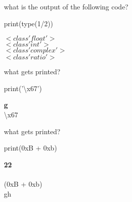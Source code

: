 \documentclass{exam}
\begin{document}
\begin{questions}
    \question what is the output of the following code?

        print(type(1/2))

    \begin{oneparchoices}
        \choice \textbf{$<class 'float'>$} \\
        \choice $<class 'int'>$ \\
        \choice $<class 'complex'>$ \\
        \choice $<class 'ratio'>$ 
    \end{oneparchoices}

    \question what gets printed?

        print('\textbackslash x67')

    \begin{oneparchoices}
        \choice \textbf{g} \\
        \choice \textbackslash x67 \\
    \end{oneparchoices}

    \question what gets printed?

        print(0xB + 0xb)

    \begin{oneparchoices}
        \choice \textbf{22} \\
         \\
        \choice (0xB + 0xb) \\
        \choice gh \\
    \end{oneparchoices}
\end{questions}
\end{document}
